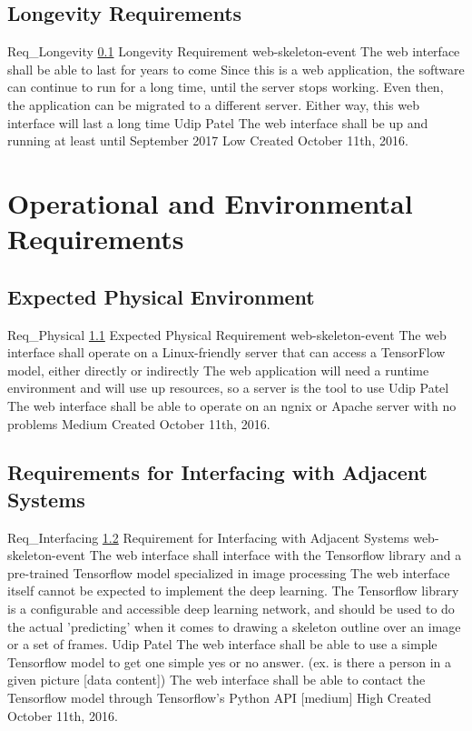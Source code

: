 \documentclass{scrreprt}
\begin{document}
\subsection{Longevity Requirements}
\label{req-longevity}
\requirement
{Req_Longevity}
{\ref{req-longevity} Longevity Requirement}
{web-skeleton-event}
{The web interface shall be able to last for years to come}
{Since this is a web application, the software can continue to run for a long time, until the server stops working. Even then, the application can be migrated to a different server. Either way, this web interface will last a long time}
{Udip Patel}
{The web interface shall be up and running at least until September 2017}
{Low}
{Created October 11th, 2016.}


\section{Operational and Environmental Requirements}

\subsection{Expected Physical Environment}
\label{req-op-env}

\requirement
{Req_Physical}
{\ref{req-op-env} Expected Physical Requirement}
{web-skeleton-event}
{The web interface shall operate on a Linux-friendly server that can access a TensorFlow model, either directly or indirectly}
{The web application will need a runtime environment and will use up resources, so a server is the tool to use }
{Udip Patel}
{The web interface shall be able to operate on an ngnix or Apache server with no problems}
{Medium}
{Created October 11th, 2016.}


\subsection{Requirements for Interfacing with Adjacent Systems}
\label{req-interfacing}

\requirement
{Req_Interfacing}
{\ref{req-interfacing} Requirement for Interfacing with Adjacent Systems}
{web-skeleton-event}
{The web interface shall interface with the Tensorflow library and a pre-trained Tensorflow model specialized in image processing}
{The web interface itself cannot be expected to implement the deep learning. The Tensorflow library is a configurable and accessible deep learning network, and should be used to do the actual 'predicting' when it comes to drawing a skeleton outline over an image or a set of frames.}
{Udip Patel}
{The web interface shall be able to use a simple Tensorflow model to get one simple yes or no answer. (ex. is there a person in a given picture [data content]) The web interface shall be able to contact the Tensorflow model through Tensorflow's Python API [medium]}
{High}
{Created October 11th, 2016.}
\end{document}
